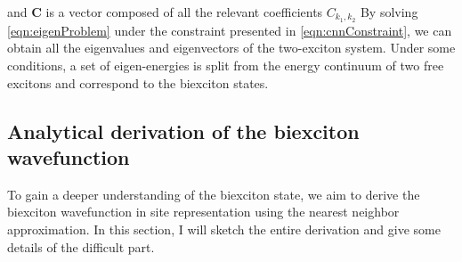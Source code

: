 and  $\mathbf{C}$ is a vector composed of all the relevant coefficients $C_{k_1, k_2}$
By solving \autoref{eqn:eigenProblem} under the constraint presented in \autoref{eqn:cnnConstraint}, we can obtain
 all the eigenvalues and eigenvectors of the 
two-exciton system. Under some conditions, a set of eigen-energies is split from the energy continuum of two free
 excitons and correspond to the biexciton states. 



\subsection{Analytical derivation of the biexciton wavefunction}
\label{sec:biexcitonWavefunction}
To gain a deeper understanding of the biexciton state, we aim to derive the biexciton wavefunction in site
 representation using the nearest neighbor approximation. In this section, I will sketch the entire derivation and give
 some details of the difficult part. 

